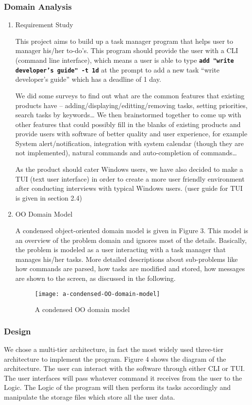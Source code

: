 \documentclass[12pt, a4paper]{article}
\newcommand{\cmdinline}[1]{{\bf \texttt{#1}}}
\begin{document}
\subsubsection{Domain Analysis}
\begin{enumerate} 
\item Requirement Study

This project aims to build up a task manager program that helps user to manager  his/her
to-do's. This program should provide the user with a CLI (command line interface), which means a
user is able to type \mbox{\cmdinline{add "write developer's guide" -t 1d}} at the prompt to add a new task ``write developer's guide'' which has a deadline of 1 day.

We did some surveys to find out what are the common features that existing products have -- adding/displaying/editting/removing tasks, setting priorities, search tasks by keywords\ldots
We then brainstormed together to come up with other features that could possibly fill in the blanks of existing products and provide users with software of better quality and user experience, for example System alert/notification, integration with system calendar (though they are not implemented), natural commands and auto-completion of commands\ldots

As the product should cater Windows users, we have also decided to make a TUI (text user interface) in order to create a
more user friendly environment after conducting interviews with typical Windows users. (user guide for TUI is given in section 2.4)

\item OO Domain Model

A condensed object-oriented domain model is given in Figure 3. This model is an overview of the
problem domain and ignores most of the details. Basically, the problem is modeled as a user
interacting with a task manager that manages his/her tasks. More detailed descriptions about sub-problems like
how commands are parsed, how tasks are modified and stored, how messages are shown to the screen, as discussed in the following.

\begin{figure}[h]
  \centering
  \texttt{[image: a-condensed-OO-domain-model]}
  \caption{A condensed OO domain model}
\end{figure}
\end{enumerate}

\subsubsection{Design}
We chose a multi-tier architecture, in fact the most widely used
three-tier architecture to implement the program. Figure 4 shows the diagram of
the architecture. The user can interact with the software through either CLI or TUI.
The user interfaces will pass whatever command it receives from the user to the Logic.
The Logic of the program will then perform its tasks accordingly and manipulate the storage
files which store all the user data.
\end{document}
